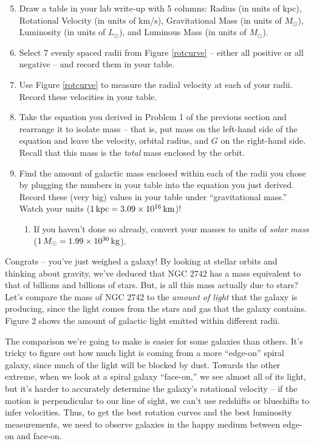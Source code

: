 \documentclass[11pt]{article}%
\begin{document}
\begin{enumerate}
\setcounter{enumi}{4}

\item Draw a table in your lab write-up with 5 columns: Radius (in units of kpc), Rotational Velocity (in units of km/s), Gravitational Mass (in units of $M_{\odot}$), Luminosity (in units of $L_{\odot}$), and Luminous Mass (in units of $M_{\odot}$).

\item Select 7 evenly spaced radii from Figure \ref{rotcurve} -- either all positive or all negative -- and record them in your table.

\item Use Figure \ref{rotcurve} to measure the radial velocity at each of your radii. Record these velocities in your table.

\item Take the equation you derived in Problem 1 of the previous section and rearrange it to isolate mass -- that is, put mass on the left-hand side of the equation and leave the velocity, orbital radius, and $G$ on the right-hand side. Recall that this mass is the \emph{total} mass enclosed by the orbit.

\item Find the amount of galactic mass enclosed within each of the radii you chose by plugging the numbers in your table into the equation you just derived. Record these (very big) values in your table under ``gravitational mass.'' Watch your units ($1 \, {\rm kpc} = 3.09 \times 10^{16} \, {\rm km}$)! 
\begin{enumerate}
    \item If you haven't done so already, convert your masses to units of \emph{solar mass} ($1 \, M_\odot = 1.99 \times 10^{30} \, {\rm kg}$).
\end{enumerate} 
\end{enumerate}

\noindent
Congrats -- you've just weighed a galaxy! By looking at stellar orbits and thinking about gravity, we've deduced that NGC 2742 has a mass equivalent to that of billions and billions of stars. But, is all this mass actually due to stars? Let's compare the mass of NGC 2742 to the \emph{amount of light} that the galaxy is producing, since the light comes from the stars and gas that the galaxy contains.  Figure 2 shows the amount of galactic light emitted within different radii. 

\medskip \noindent
The comparison we're going to make is easier for some galaxies than others. It's tricky to figure out how much light is coming from a more ``edge-on'' spiral galaxy, since much of the light will be blocked by dust. Towards the other extreme, when we look at a spiral galaxy ``face-on,'' we see almost all of its light, but it's harder to accurately determine the galaxy's rotational velocity -- if the motion is perpendicular to our line of sight, we can't use redshifts or blueshifts to infer velocities. Thus, to get the best rotation curves and the best luminosity measurements, we need to observe galaxies in the happy medium between edge-on and face-on.
\end{document}
